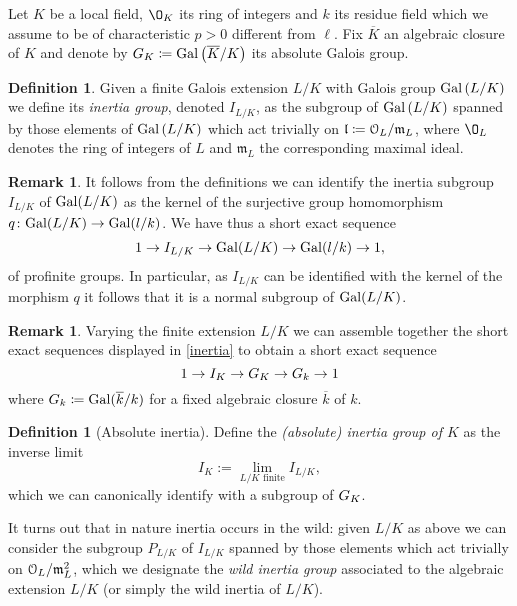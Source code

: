 \documentclass[10pt,a4paper]{amsart}
\numberwithin{equation}{subsection}
\theoremstyle{plain}
\theoremstyle{definition}
\newtheorem{defi}[theorem]{Definition}
\newtheorem{rema}[theorem]{Remark}
\theoremstyle{remark}
\numberwithin{equation}{section}
\begin{document}
Let $K$ be a local field, $\O_K$ its ring of integers and $k$ its residue field which we assume to be of characteristic $p>0$ different from $\ell$. Fix $\overline{K}$ an algebraic closure of $K$ and denote by $G_K \coloneqq
 \mathrm{Gal} \left( \overline{K} / K \right)$ its absolute Galois group.
 
 \begin{defi}
Given a finite Galois extension $L/K$ with Galois group $\mathrm{Gal} \left( L / K \right)$ we define its \emph{inertia group}, denoted $I_{L/K} $, as the subgroup of $\mathrm{Gal} \left( L / K \right)$
spanned by those elements of $\mathrm{Gal} \left( L /K \right)$ which act trivially on $\mathfrak l \coloneqq \mathcal{O}_L / \mathfrak{m}_L$, where $\O_L $ denotes the ring of integers of $L$ and $ \mathfrak{m}_L$ the corresponding maximal ideal. 
\end{defi}

\begin{rema}
It follows from the definitions we can identify the inertia subgroup $ I_{L/K}$ of $\mathrm{Gal}( L / K )$ as the kernel of the surjective group homomorphism $q \colon \mathrm{Gal}( L / K ) \to \mathrm{Gal}( l/ k)$. We have thus a short exact sequence
	\begin{equation} \label{inertia}
		1 \to I_{L/K} \to \mathrm{Gal}( L / K ) \to \mathrm{Gal}( l/ k) \to 1,
	\end{equation}
of profinite groups. In particular,
as $I_{L / K }$ can be identified with the kernel of the morphism $q$ it follows that it is a normal subgroup of $\mathrm{Gal}( L / K)$.
\end{rema}

\begin{rema}
Varying the finite extension $L/K$ we can assemble
together the short exact sequences displayed in \eqref{inertia} to obtain a short exact sequence
	\begin{equation} \label{absinert}
		1 \to I_K \to G_K \to G_k \to 1
	\end{equation}
where $G_k \coloneqq \mathrm{Gal}( \overline{k}/ k)$ for a fixed algebraic closure $\overline{k}$ of $k$.
\end{rema}

\begin{defi}[Absolute inertia]
Define the \emph{(absolute) inertia group of $K$} as the inverse limit
	\[
		I_K := \lim_{L/K \text{ finite}} I_{L/ K},
	\]
which we can canonically identify with a subgroup of $G_K$.
\end{defi}

It turns out that in nature inertia occurs in the wild:
given $L/ K$ as above we can consider the subgroup $P_{L/K}$ of $I_{L/K}$ spanned by those elements which act trivially on $\mathcal{O}_L/ \mathfrak{m}^2_L$, which we designate the \emph{wild inertia group} associated to the algebraic extension $L/K$ (or simply the wild inertia
of $L/
K$). 
\end{document}
